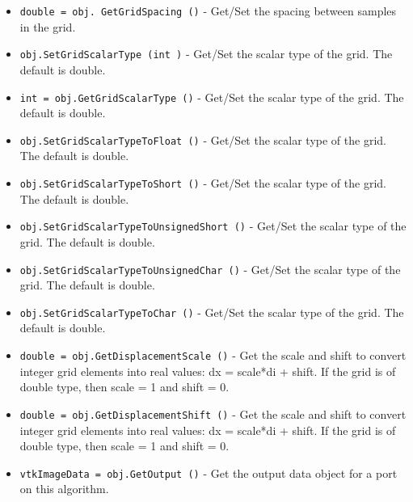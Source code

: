 \begin{itemize}
\item  \verb|double = obj. GetGridSpacing ()| -  Get/Set the spacing between samples in the grid.

\item  \verb|obj.SetGridScalarType (int )| -  Get/Set the scalar type of the grid.  The default is
 double.

\item  \verb|int = obj.GetGridScalarType ()| -  Get/Set the scalar type of the grid.  The default is
 double.

\item  \verb|obj.SetGridScalarTypeToFloat ()| -  Get/Set the scalar type of the grid.  The default is
 double.

\item  \verb|obj.SetGridScalarTypeToShort ()| -  Get/Set the scalar type of the grid.  The default is
 double.

\item  \verb|obj.SetGridScalarTypeToUnsignedShort ()| -  Get/Set the scalar type of the grid.  The default is
 double.

\item  \verb|obj.SetGridScalarTypeToUnsignedChar ()| -  Get/Set the scalar type of the grid.  The default is
 double.

\item  \verb|obj.SetGridScalarTypeToChar ()| -  Get/Set the scalar type of the grid.  The default is
 double.

\item  \verb|double = obj.GetDisplacementScale ()| -  Get the scale and shift to convert integer grid elements into
 real values:  dx = scale*di + shift.  If the grid is of double type,
 then scale = 1 and shift = 0.

\item  \verb|double = obj.GetDisplacementShift ()| -  Get the scale and shift to convert integer grid elements into
 real values:  dx = scale*di + shift.  If the grid is of double type,
 then scale = 1 and shift = 0.

\item  \verb|vtkImageData = obj.GetOutput ()| -  Get the output data object for a port on this algorithm.

\end{itemize}
